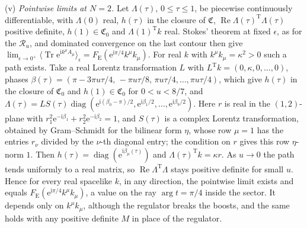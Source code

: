 (v) \emph{Pointwise limits at \(N=2\).} Let \(\Lambda(\tau)\), \(0\le\tau\le1\), be piecewise continuously differentiable, with \(\Lambda(0)\) real, \(h(\tau)\) in the closure of \(\mathfrak C\), \(\operatorname{Re}\Lambda(\tau)^{\mathrm T}\Lambda(\tau)\) positive definite, \(h(1)\in\mathfrak C_0\) and \(\Lambda(1)^{\mathrm T}k\) real. Stokes' theorem at fixed \(\epsilon\), as for the \(\mathcal R_u\), and dominated convergence on the last contour then give \(\lim_{\epsilon\to0^+}\langle\operatorname{Tr}\mathrm e^{\mathrm ik^\mu A_\mu}\rangle_\epsilon=F_{\mathrm E}(\mathrm e^{\mathrm i\pi/4}k^\mu k_\mu)\). For real \(k\) with \(k^\mu k_\mu=\kappa^2>0\) such a path exists. Take a real Lorentz transformation \(L\) with \(L^{\mathrm T}k=(0,\kappa,0,\dots,0)\), phases \(\beta(\tau)=(\pi-3\pi u\tau/4,\,-\pi u\tau/8,\,\pi u\tau/4,\dots,\pi u\tau/4)\), which give \(h(\tau)\) in the closure of \(\mathfrak C_0\) and \(h(1)\in\mathfrak C_0\) for \(0<u<8/7\), and \(\Lambda(\tau)=LS(\tau)\operatorname{diag}(\mathrm e^{\mathrm i(\beta_0-\pi)/2},\mathrm e^{\mathrm i\beta_1/2},\dots,\mathrm e^{\mathrm i\beta_9/2})\). Here \(r\) is real in the \((1,2)\)-plane with \(r_1^2\mathrm e^{-\mathrm i\beta_1}+r_2^2\mathrm e^{-\mathrm i\beta_2}=1\), and \(S(\tau)\) is a complex Lorentz transformation, obtained by Gram--Schmidt for the bilinear form \(\eta\), whose row \(\mu=1\) has the entries \(r_\nu\) divided by the \(\nu\)-th diagonal entry; the condition on \(r\) gives this row \(\eta\)-norm \(1\). Then \(h(\tau)=\operatorname{diag}(\mathrm e^{\mathrm i\beta_\mu(\tau)})\) and \(\Lambda(\tau)^{\mathrm T}k=\kappa r\). As \(u\to0\) the path tends uniformly to a real matrix, so \(\operatorname{Re}\Lambda^{\mathrm T}\Lambda\) stays positive definite for small \(u\). Hence for every real spacelike \(k\), in any direction, the pointwise limit exists and equals \(F_{\mathrm E}(\mathrm e^{\mathrm i\pi/4}k^\mu k_\mu)\), a value on the ray \(\arg t=\pi/4\) inside the sector. It depends only on \(k^\mu k_\mu\), although the regulator breaks the boosts, and the same holds with any positive definite \(M\) in place of the regulator.

